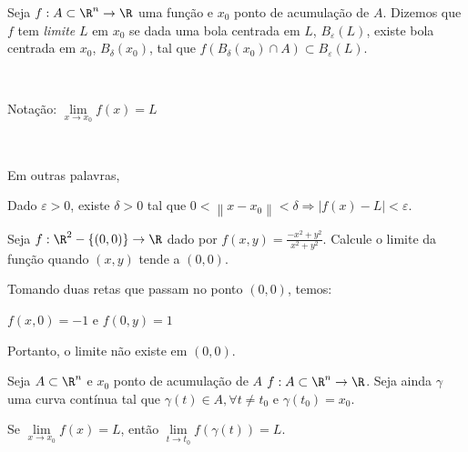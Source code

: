 \documentclass{book}
\begin{document}
\begin{defn}[Limite]
    Seja $f:A \subset \R^n  \to \R$ uma fun\c c\~ao e $x_0$ ponto de acumula\c c\~ao de $A$. Dizemos que $f$ tem \textit{limite} $L$ em $x_0$ se dada uma bola centrada em $L$, $B_\varepsilon  \left( L \right)$, existe bola centrada em $x_0$, $B_\delta  \left( {x_0 } \right)$, tal que $f\left( {B_\delta  \left( {x_0 } \right) \cap A} \right) \subset B_\varepsilon  \left( L \right)$.

\

Nota\c c\~ao: $\displaystyle \mathop {\lim }\limits_{x \to x_0 } f\left( x \right) = L$

\

Em outras palavras,

    Dado $\varepsilon  > 0$, existe $\delta  > 0$ tal que $0 < \left\| {x - x_0 } \right\| < \delta  \Rightarrow \left| {f\left( x \right) - L} \right| < \varepsilon$.
\end{defn}

\begin{ex}
    Seja $f:\R^2  - \left\{ {\left( {0,0} \right)} \right\} \to \R$ dado por $\displaystyle f\left( {x,y} \right) = \frac{{ - x^2  + y^2 }}{{x^2  + y^2 }}$. Calcule o limite da fun\c c\~ao quando $(x,y)$ tende a $(0,0)$.
\end{ex}

\begin{sol}
Tomando duas retas que passam no ponto $(0,0)$, temos:

$f\left( {x,0} \right) =  - 1$ e $f\left( {0,y} \right) = 1$

Portanto, o limite n\~ao existe em $(0,0)$.
\end{sol}

\begin{teo}
    Seja $A \subset \R^n$ e $x_0$ ponto de acumula\c c\~ao de $A$ $f:A \subset \R^n  \to \R$. Seja ainda $\gamma$ uma curva cont\'inua tal que $\gamma \left( t \right) \in A,\forall t \ne t_0$ e $\gamma \left( {t_0 } \right) = x_0$.

    Se $\mathop {\lim }\limits_{x \to x_0 } f\left( x \right) = L$, ent\~ao $\mathop {\lim }\limits_{t \to t_0 } f\left( {\gamma \left( t \right)} \right) = L$.
\end{teo}
\end{document}
